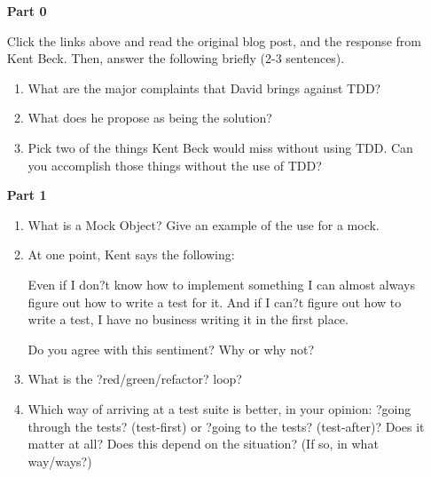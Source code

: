 \begin{enumerate}
	\item[\bf{Part 0}]
	
		Click the links above and read the original blog post, and the response from Kent Beck. Then, answer the following briefly (2-3 sentences).
		
		\begin{enumerate}
			\item What are the major complaints that David brings against TDD?
			
			
			\item What does he propose as being the solution?
			
			
			\item Pick two of the things Kent Beck would miss without using TDD. Can you accomplish those things without the use of TDD?
			
		\end{enumerate}	
		
	\item[\bf{Part 1}]
	
		\begin{enumerate}
			
			\item What is a Mock Object? Give an example of the use for a mock.
				

			\item At one point, Kent says the following:
				
				Even if I don?t know how to implement something I can almost always figure out how to write a test for it. And if I can?t figure out how to write a test, I have no business writing it in the first place.

				Do you agree with this sentiment? Why or why not?
				

			\item What is the ?red/green/refactor? loop?
				

			\item Which way of arriving at a test suite is better, in your opinion: ?going through the tests? (test-first) or ?going to the tests? (test-after)? Does it matter at all? Does this depend on the situation? (If so, in what way/ways?)
				


\end{enumerate}
\end{enumerate}
